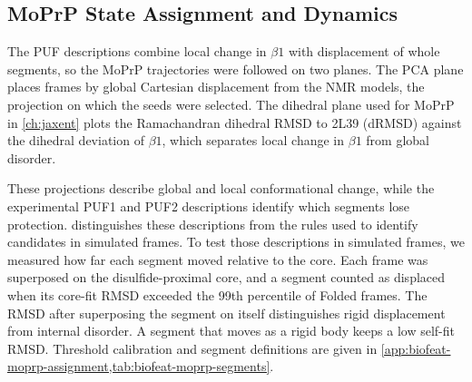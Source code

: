 \subsection{MoPrP State Assignment and Dynamics}
\label{sec:biofeat-moprp-analysis}

The PUF descriptions combine local change in $\beta1$ with displacement of whole segments, so the MoPrP trajectories were followed on two planes. The PCA plane places frames by global Cartesian displacement from the NMR models, the projection on which the seeds were selected. The dihedral plane used for MoPrP in \cref{ch:jaxent} plots the Ramachandran dihedral RMSD to 2L39 (dRMSD) against the dihedral deviation of $\beta1$, which separates local change in $\beta1$ from global disorder.

These projections describe global and local conformational change, while the experimental PUF1 and PUF2 descriptions identify which segments lose protection.\supercite{moulickPartiallyUnfoldedForms2015}  distinguishes these descriptions from the rules used to identify candidates in simulated frames. To test those descriptions in simulated frames, we measured how far each segment moved relative to the core. Each frame was superposed on the disulfide-proximal core, and a segment counted as displaced when its core-fit RMSD exceeded the 99th percentile of Folded frames. The RMSD after superposing the segment on itself distinguishes rigid displacement from internal disorder. A segment that moves as a rigid body keeps a low self-fit RMSD. Threshold calibration and segment definitions are given in \cref{app:biofeat-moprp-assignment,tab:biofeat-moprp-segments}.

